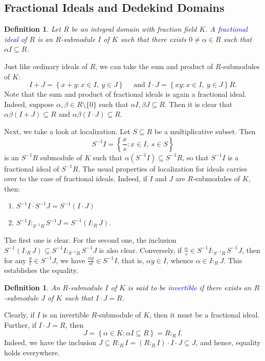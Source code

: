 \documentclass[11pt]{article}
\theoremstyle{thmstyle}
\theoremstyle{defstyle}
\newtheorem{definition}[theorem]{Definition}
\newcommand{\define}[1]{\textcolor{blue}{\textit{#1}}}
\begin{document}
\subsection{Fractional Ideals and Dedekind Domains}

\begin{definition}
    Let $R$ be an integral domain with fraction field $K$. A \define{fractional ideal} of $R$ is an $R$-submodule $I$ of $K$ such that there exists $0\ne\alpha\in R$ such that $\alpha I\subseteq R$.
\end{definition}

Just like ordinary ideals of $R$, we can take the sum and product of $R$-submodules of $K$: 
\begin{equation*}
    I + J = \left\{x + y\colon x\in I,~y\in J\right\}\quad\text{ and } I\cdot J = \left\{xy\colon x\in I,~y\in J\right\}R.
\end{equation*}
Note that the sum and product of fractional ideals is again a fractional ideal. Indeed, suppose $\alpha, \beta\in R\setminus\{0\}$ such that $\alpha I, \beta J\subseteq R$. Then it is clear that $\alpha\beta(I + J)\subseteq R$ and $\alpha\beta(I\cdot J)\subseteq R$. 

Next, we take a look at localization. Let $S\subseteq R$ be a multiplicative subset. Then 
\begin{equation*}
    S^{-1}I = \left\{\frac{x}{s}\colon x\in I,~s\in S\right\}
\end{equation*}
is an $S^{-1}R$ submodule of $K$ such that $\alpha(S^{-1}I)\subseteq S^{-1}R$, so that $S^{-1}I$ is a fractional ideal of $S^{-1}R$. The usual properties of localization for ideals carries over to the case of fractional ideals. Indeed, if $I$ and $J$ are $R$-submodules of $K$, then:
\begin{enumerate}[label=(\roman*)]
    \item $S^{-1}I\cdot S^{-1}J = S^{-1}(I\cdot J)$
    \item $S^{-1}I\colon_{S^{-1}R} S^{-1}J = S^{-1}\left(I\colon_R J\right)$.
\end{enumerate}
The first one is clear. For the second one, the inclusion $S^{-1}(I\colon_R J)\subseteq S^{-1}I\colon_{S^{-1}R} S^{-1}J$ is also clear. Conversely, if $\frac{\alpha}{s}\in S^{-1}I\colon_{S^{-1}R} S^{-1}J$, then for any $\frac{y}{t}\in S^{-1}J$, we have $\frac{\alpha y}{st}\in S^{-1}I$, that is, $\alpha y\in I$, whence $\alpha\in I\colon_R J$. This establishes the equality.

\begin{definition}
    An $R$-submodule $I$ of $K$ is said to be \define{invertible} if there exists an $R$-submodule $J$ of $K$ such that $I\cdot J = R$.
\end{definition}
Clearly, if $I$ is an invertible $R$-submodule of $K$, then it must be a fractional ideal. Further, if $I\cdot J = R$, then 
\begin{equation*}
    J = \left\{\alpha\in K\colon\alpha I\subseteq R\right\} = R\colon_R I.
\end{equation*}
Indeed, we have the inclusion $J\subseteq R\colon_R I = (R\colon_R I)\cdot I\cdot J\subseteq J$, and hence, equality holds everywhere.
\end{document}
